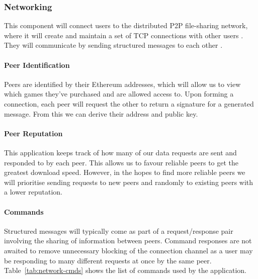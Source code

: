 \subsubsection{Networking}\label{subsubsec:networking}

This component will connect users to the distributed P2P file-sharing network, where it will create and maintain a set of TCP connections with other users . They will communicate by sending structured messages to each other .

\paragraph*{Peer Identification}
Peers are identified by their Ethereum addresses, which will allow us to view which games they've purchased and are allowed access to. Upon forming a connection, each peer will request the other to return a signature for a generated message. From this we can derive their address and public key.

\paragraph*{Peer Reputation}
This application keeps track of how many of our data requests are sent and responded to by each peer. This allows us to favour reliable peers to get the greatest download speed. However, in the hopes to find more reliable peers we will prioritise sending requests to new peers and randomly to existing peers with a lower reputation.  

\paragraph*{Commands}\label{subsubsec:commands}

Structured messages  will typically come as part of a request/response pair involving the sharing of information between peers. Command responses are not awaited to remove unnecessary blocking of the connection channel as a user may be responding to many different requests at once by the same peer. 
\x
Table~\ref{tab:network-cmds} shows the list of commands used by the application.

